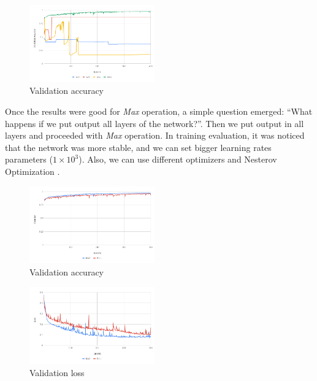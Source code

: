 \begin{figure}[ht]
  \centering
  \includegraphics[width=0.48\textwidth]{figures/val_acc_all.png}
  \caption{Validation accuracy}
  \label{fig:val_accuracy_all}
\end{figure}

Once the results were good for \textit{Max} operation, a simple question emerged: ``What happens if we put output all layers of the network?''. Then we put output in all layers and proceeded with \textit{Max} operation. In training evaluation, it was noticed that the network was more stable, and we can set bigger learning rates parameters ($1 \times 10^3$). Also, we can use different optimizers and Nesterov Optimization \cite{Nesterov:1983wy}.

\begin{figure}[ht]
  \centering
  \includegraphics[width=0.48\textwidth]{figures/val_acc.png}
  \caption{Validation accuracy}
  \label{fig:val_accuracy}
\end{figure}

\begin{figure}[ht]
  \centering
  \includegraphics[width=0.48\textwidth]{figures/val_loss.png}
  \caption{Validation loss}
  \label{fig:val_loss}
\end{figure}

